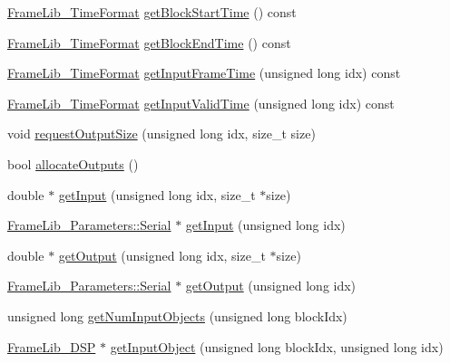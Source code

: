 \begin{DoxyCompactItemize}
\item 
\hyperlink{_frame_lib___types_8h_a699a4071a9eaaa283906a5ebd0a79ac0}{Frame\+Lib\+\_\+\+Time\+Format} \hyperlink{class_frame_lib___d_s_p_a9c34c56420ff9da196150e8a5307e812}{get\+Block\+Start\+Time} () const
\item 
\hyperlink{_frame_lib___types_8h_a699a4071a9eaaa283906a5ebd0a79ac0}{Frame\+Lib\+\_\+\+Time\+Format} \hyperlink{class_frame_lib___d_s_p_a8cd169b635307807b29f1d02ea23635e}{get\+Block\+End\+Time} () const
\item 
\hyperlink{_frame_lib___types_8h_a699a4071a9eaaa283906a5ebd0a79ac0}{Frame\+Lib\+\_\+\+Time\+Format} \hyperlink{class_frame_lib___d_s_p_a705ddc874bc5643f81a0f71894f1ae0c}{get\+Input\+Frame\+Time} (unsigned long idx) const
\item 
\hyperlink{_frame_lib___types_8h_a699a4071a9eaaa283906a5ebd0a79ac0}{Frame\+Lib\+\_\+\+Time\+Format} \hyperlink{class_frame_lib___d_s_p_a699dda68553ddebd5ca8c70326fb40a5}{get\+Input\+Valid\+Time} (unsigned long idx) const
\item 
void \hyperlink{class_frame_lib___d_s_p_a018be5346f473c3c21d5251d6acb85c7}{request\+Output\+Size} (unsigned long idx, size\+\_\+t size)
\item 
bool \hyperlink{class_frame_lib___d_s_p_abbf404ed95c61cfa713c988b10f76202}{allocate\+Outputs} ()
\item 
double $\ast$ \hyperlink{class_frame_lib___d_s_p_a1d139d046d9269f9f6ac34c8ee8ab516}{get\+Input} (unsigned long idx, size\+\_\+t $\ast$size)
\item 
\hyperlink{class_frame_lib___parameters_1_1_serial}{Frame\+Lib\+\_\+\+Parameters\+::\+Serial} $\ast$ \hyperlink{class_frame_lib___d_s_p_a6212469bed2fe6d4a994062bc85db98f}{get\+Input} (unsigned long idx)
\item 
double $\ast$ \hyperlink{class_frame_lib___d_s_p_a0b93f60dad1696bfbb80cedb5d406c40}{get\+Output} (unsigned long idx, size\+\_\+t $\ast$size)
\item 
\hyperlink{class_frame_lib___parameters_1_1_serial}{Frame\+Lib\+\_\+\+Parameters\+::\+Serial} $\ast$ \hyperlink{class_frame_lib___d_s_p_a614a975377a289f8bdaa2eba0c1c41b6}{get\+Output} (unsigned long idx)
\item 
unsigned long \hyperlink{class_frame_lib___d_s_p_a3864d31866672734f27c80d6eff15d47}{get\+Num\+Input\+Objects} (unsigned long block\+Idx)
\item 
\hyperlink{class_frame_lib___d_s_p}{Frame\+Lib\+\_\+\+D\+SP} $\ast$ \hyperlink{class_frame_lib___d_s_p_a11c7de51dabca61ca89e5fc178144725}{get\+Input\+Object} (unsigned long block\+Idx, unsigned long idx)

\end{DoxyCompactItemize}
